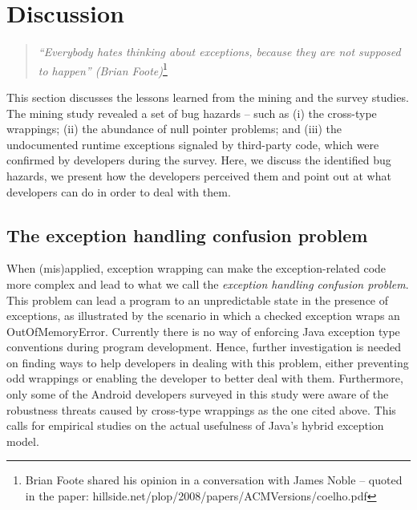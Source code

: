 {\bigskip

\section{Discussion}
\label{sec:disc}

\begin{quotation}
\noindent
 \emph{``Everybody hates thinking about exceptions, because they are not supposed to happen''
  (Brian Foote)}\footnote{Brian Foote shared his opinion in a conversation with James Noble -- quoted in the paper: hillside.net/plop/2008/papers/ACMVersions/coelho.pdf}
\end{quotation}

This section discusses the lessons learned from the mining and the survey studies. The mining study revealed a set of bug
hazards -- such as (i) the cross-type wrappings; (ii) the abundance of null pointer problems; and (iii) the undocumented runtime
exceptions signaled by third-party code, which were confirmed by developers
during the survey. Here, we discuss the identified bug hazards, we present how
the developers perceived them and point out at what developers can do in
order to deal with them.


\subsection{The exception handling confusion problem}
When (mis)applied, exception wrapping can make the exception-related code
 more complex and lead to what we call the \emph{exception handling confusion problem}.
This problem can lead a program to an unpredictable state in the presence of exceptions,
as illustrated by the scenario in which a checked exception wraps an OutOfMemoryError.
Currently there is no way of enforcing Java exception type conventions during program development.
Hence, further investigation is needed on finding ways to help developers in dealing with this
 problem, either preventing odd wrappings or enabling the developer to
 better deal with them.
Furthermore, only some of the Android developers surveyed in this study were aware of the
robustness threats caused by cross-type wrappings as the one cited above. This calls for empirical studies on the actual usefulness of Java's hybrid exception model.


}
